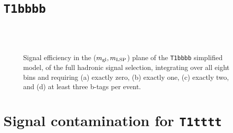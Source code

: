 \newpage
\section{\texttt{T1bbbb}\label{app:sig-eff-t1bbbb}}

\begin{figure}[h!]
  \begin{center}
     \\
     \\
    \caption{\label{fig:sig-eff-t1bbbb}Signal efficiency in the ($m_{\rm
        gl},m_{\rm LSP}$) plane of the \texttt{T1bbbb} simplified model,
      of the full hadronic signal selection, integrating over all
      eight \HT bins and requiring (a) exactly zero, (b) exactly
      one, (c) exactly two, and (d) at least three b-tags per event.}
  \end{center}
\end{figure}

\newpage
\section{Signal contamination for \texttt{T1tttt}\label{app:sig-eff-contam}}

